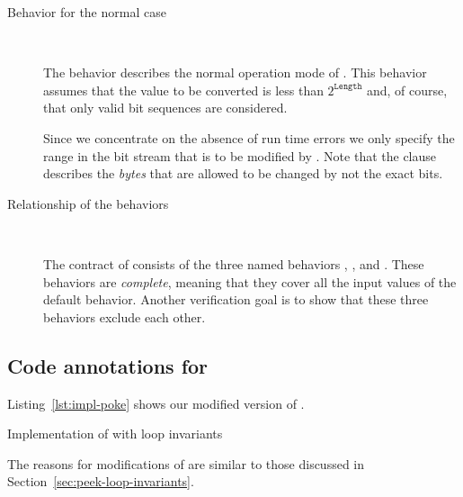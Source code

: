 \begin{description}
\item[Behavior for the normal case]~

The behavior  describes the normal operation mode of \peek.
This behavior assumes that the value to be converted is less than $2^{\mathtt{Length}}$
and, of course, that only valid bit sequences are considered.

Since we concentrate on the absence of run time errors we only
specify the range in the bit stream that is to be modified by \poke.
Note that the  clause describes the \emph{bytes}
that are allowed to be changed by \poke not the exact bits.


\item[Relationship of the behaviors]~

The contract of \poke consists of the three named behaviors
, , and .
These behaviors are \emph{complete}, meaning that they cover all the input values
of the default behavior.
Another verification goal is to show that these three behaviors exclude each other.

\end{description}


\clearpage

\subsection{Code annotations for \poke}
\label{sec:poke-loop-invariants}

Listing~\ref{lst:impl-poke} shows our modified version of \poke.

\begin{listing}[hbt]
\begin{minipage}{\textwidth}

\end{minipage}
\caption{\label{lst:impl-poke} Implementation of \poke with loop invariants}
\end{listing}

\clearpage

The reasons for modifications of \poke are similar to those discussed
in Section~\ref{sec:peek-loop-invariants}.

